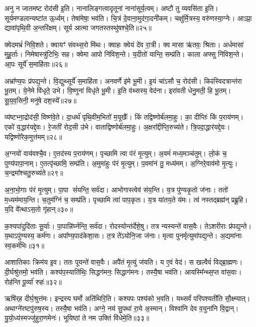 अनु न जातमष्ट रोद॑सी इ॒ति। नानालिङ्गत्वादृतूनां नाना॑सूर्य॒त्वम्। 
अष्टौ तु व्यवसि॑ता इ॒ति। सूर्यमण्डलान्यष्टा॑त ऊ॒र्ध्वम्। 
तेषा॑मेषा॒ भव॑ति। चि॒त्रं दे॒वाना॒मुद॑गा॒दनी॑कम्। 
चक्षु॑र्मि॒त्रस्य॒ वरु॑णस्या॒ग्नेः। आऽप्रा॒ द्यावा॑पृथि॒वी अ॒न्तरि॑क्षम्। 
सूर्य आत्मा जगतस्तस्थु॑षश्चे॒ति॥२५॥\anuvakamend


क्वेदमभ्रं॑ निवि॒शते। क्वायꣳ॑ संवथ्स॒रो मि॑थः। 
क्वाहः क्वेयं दे॑व रा॒त्री। क्व मासा ऋ॑तवः॒ श्रिताः। 
अर्धमासा॑ मुहू॒र्ताः। निमेषास्त्रु॑टिभिः॒ सह। 
क्वेमा आपो नि॑विश॒न्ते। य॒दीतो॑ यान्ति॒ सम्प्र॑ति। 
काला अफ्सु नि॑विश॒न्ते। आ॒पः सूर्ये॑ स॒माहि॑ताः॥२६॥

अभ्रा᳚ण्य॒पः प्र॑पद्य॒न्ते। वि॒द्युथ्सूर्ये॑ स॒माहि॑ता। 
अनवर्णे इ॑मे भू॒मी। इ॒यं चा॑ऽसौ च॒ रोद॑सी। 
किꣴस्विदत्रान्त॑रा भू॒तम्। ये॒नेमे वि॑धृते॒ उभे। 
वि॒ष्णुना॑ विधृ॑ते भू॒मी। इ॒ति व॑थ्सस्य॒ वेद॑ना। 
इरा॑वती धेनु॒मती॒ हि भू॒तम्। सू॒य॒व॒सिनी॒ मनु॑षे दश॒स्ये᳚॥२७॥

व्य॑ष्टभ्ना॒द्रोद॑सी॒ विष्ण॑वे॒ते। दा॒धर्थ॑ पृथि॒वीम॒भितो॑ म॒यूखैः᳚। 
किं तद्विष्णोर्ब॑ल\-मा॒हुः। का॒ दीप्तिः॑ किं प॒राय॑णम्। 
एको॑ य॒द्धार॑यद्दे॒वः। रे॒जती॑ रोद॒सी उ॑भे। 
वाताद्विष्णोर्ब॑लमा॒हुः। अ॒क्षरा᳚द्दीप्ति॒रुच्य॑ते। 
त्रि॒पदा॒द्धार॑यद्दे॒वः। यद्विष्णो॑रेक॒मुत्त॑मम्॥२८॥

अ॒ग्नयो॑ वाय॑वश्चै॒व। ए॒तद॑स्य प॒राय॑णम्। 
पृच्छामि त्वा प॑रं मृ॒त्युम्। अ॒वमं॑ मध्य॒मञ्च॑तुम्। 
लो॒कं च॒ पुण्य॑पापा॒नाम्। ए॒तत्पृ॑च्छामि॒ सम्प्र॑ति। 
अ॒मुमा॑हुः प॑रं मृ॒त्युम्। प॒वमा॑नं तु॒ मध्य॑मम्। 
अ॒ग्निरे॒वाव॑मो मृ॒त्युः। च॒न्द्रमा᳚श्चतु॒रुच्य॑ते॥२९॥

अ॒ना॒भो॒गाः प॑रं मृ॒त्युम्। पा॒पा सं॑यन्ति॒ सर्व॑दा। 
आभोगास्त्वेव॑ संय॒न्ति। य॒त्र पु॑ण्यकृ॒तो ज॑नाः। 
ततो॑ म॒ध्यम॑माय॒न्ति। च॒तुम॑ग्निं च॒ सम्प्र॑ति। 
पृच्छामि त्वा॑ पाप॒कृतः। य॒त्र या॑तय॒ते य॑मः। 
त्वं नस्तद्ब्रह्म॑न्‌ प्रब्रू॒हि। य॒दि वे᳚त्थाऽस॒तो गृ॑हान्॥३०॥

क॒श्यपा॑दुदि॑ताः सू॒र्याः। पा॒पान्नि॑र्घ्नन्ति॒ सर्व॑दा। 
रोदस्योन्त॑र्दे\-शे॒षु। तत्र न्यस्यन्ते॑ वास॒वैः। 
तेऽशरीराः प्र॑पद्य॒न्ते। य॒था\-ऽपु॑ण्यस्य॒ कर्म॑णः। 
अपा᳚ण्य॒पाद॑केशा॒सः। त॒त्र ते॑ऽयोनि॒जा ज॑नाः। 
मृत्वा पुनर्मृत्युमा॑पद्य॒न्ते। अ॒द्यमा॑नाः स्व॒कर्म॑भिः॥३१॥

आशातिकाः क्रिम॑य इ॒व। ततः पूयन्ते॑ वास॒वैः। अपै॑तं मृ॒त्युं ज॑यति। 
य ए॒वं वेद॑। स खल्वैवं॑ विद्ब्रा॒ह्मणः। दी॒र्घश्रु॑त्तमो॒ भव॑ति। 
कश्य॑प॒स्याति॑थिः॒ सिद्धग॑मनः॒ सिद्धाग॑मनः। तस्यै॒षा भव॑ति। 
आयस्मि᳚न्थ्स॒प्त वा॑स॒वाः। रोह॑न्ति पू॒र्व्या॑ रुहः॑॥३२॥

ऋषि॑र्‌ह दीर्घ॒श्रुत्त॑मः। इन्द्रस्य घर्मो अति॑थिरि॒ति। 
कश्यपः पश्य॑को भ॒वति। यथ्सर्वं परिपश्यती॑ति सौ॒क्ष्म्यात्। 
अथाग्ने॑रष्टपु॑रुष॒स्य। तस्यै॒षा भव॑ति। 
अग्ने॒ नय॑ सु॒पथा॑ रा॒ये अ॒स्मान्। विश्वा॑नि देव व॒युना॑नि वि॒द्वान्। 
यु॒यो॒ध्य॑स्मज्जु॑हुरा॒णमेनः॑। भूयिष्ठां ते नम उक्तिं वि॑धेमे॒ति॥३३॥\anuvakamend


